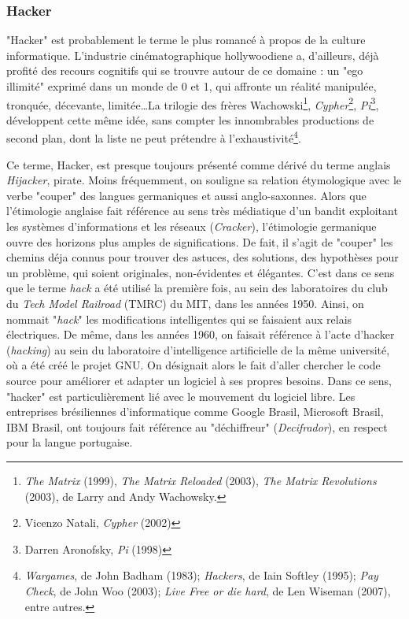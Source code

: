 \subsubsection{Hacker} \label{2.1.1.a}

"Hacker" est probablement le terme le plus romancé à propos de la culture informatique. L'industrie cinématographique hollywoodiene a, d'ailleurs, déjà profité des recours cognitifs qui se trouvre autour de ce domaine : un "ego illimité" exprimé dans un monde de 0 et 1, qui affronte un réalité manipulée, tronquée, décevante, limitée\ldots La trilogie des frères Wachowski\footnote{\emph{The Matrix} (1999), \emph{The Matrix Reloaded} (2003), \emph{The Matrix Revolutions} (2003), de Larry and Andy Wachowsky.}, \emph{Cypher}\footnote{Vicenzo Natali, \emph{Cypher} (2002)}, \emph{Pi}\footnote{Darren Aronofsky, \emph{Pi} (1998)}, développent cette même idée, sans compter les innombrables productions de second plan, dont la liste ne peut prétendre à l'exhaustivité\footnote{\emph{Wargames}, de John Badham (1983); \emph{Hackers}, de Iain Softley (1995); \emph{Pay Check}, de John Woo (2003); \emph{Live Free or die hard}, de Len Wiseman (2007), entre autres.}.

Ce terme, Hacker, est presque toujours présenté comme dérivé du terme anglais \emph{Hijacker}, pirate. Moins fréquemment, on souligne sa relation étymologique avec le verbe "couper" des langues germaniques et aussi anglo-saxonnes. Alors que l'étimologie anglaise fait référence au sens très médiatique d'un bandit exploitant les systèmes d'informations et les réseaux (\emph{Cracker}), l'étimologie germanique ouvre des horizons plus amples de significations. De fait, il s'agit de "couper" les chemins déja connus pour trouver des astuces, des solutions, des hypothèses pour un problème, qui soient originales, non-évidentes et élégantes. C'est dans ce sens que le terme \emph{hack} a été utilisé la première fois, au sein des laboratoires du club du \emph{Tech Model Railroad} (TMRC) du MIT, dans les années 1950. Ainsi, on nommait "\emph{hack}" les modifications intelligentes qui se faisaient aux relais électriques. De même, dans les années 1960, on faisait référence à l'acte d'hacker (\emph{hacking}) au sein du laboratoire d'intelligence artificielle de la même université, où a été créé le projet GNU. On désignait alors le fait d'aller chercher le code source pour améliorer et adapter un logiciel à ses propres besoins. Dans ce sens, "hacker" est particulièrement lié avec le mouvement du logiciel libre. Les entreprises brésiliennes d'informatique comme Google Brasil, Microsoft Brasil, IBM Brasil, ont toujours fait référence au "déchiffreur" (\emph{Decifrador}), en respect pour la langue portugaise.

